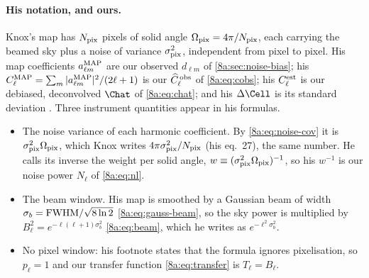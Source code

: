 \paragraph{His notation, and ours.}
Knox's map has $N_{\rm pix}$ pixels of solid angle $\Omega_{\rm pix}=4\pi/N_{\rm pix}$, each
carrying the beamed sky plus a noise of variance $\sigma_{\rm pix}^2$, independent from pixel to
pixel. His map coefficients $a^{\rm MAP}_{\ell m}$ are our observed $d_{\ell m}$ of
\cref{8a:sec:noise-bias}; his $C^{\rm MAP}_\ell=\sum_m|a^{\rm MAP}_{\ell m}|^2/(2\ell+1)$ is our
$\widehat C^{\,\rm obs}_\ell$ of \eqref{8a:eq:cobs}; his $C^{\rm est}_\ell$ is our debiased,
deconvolved $\Chat$ of \eqref{8a:eq:chat}; and his $\Delta\Cell$ is its standard deviation
. Three instrument quantities appear in his formulas.
\begin{itemize}
  \item The noise variance of each harmonic coefficient. By \eqref{8a:eq:noise-cov} it is
        $\sigma_{\rm pix}^2\Omega_{\rm pix}$, which Knox writes $4\pi\sigma_{\rm pix}^2/N_{\rm pix}$
        (his eq.~27), the same number. He calls its inverse the weight per solid angle,
        $w\equiv(\sigma_{\rm pix}^2\Omega_{\rm pix})^{-1}$, so his $w^{-1}$ is our noise power
        $N_\ell$ of \eqref{8a:eq:nl}.
  \item The beam window. His map is smoothed by a Gaussian beam of width
        $\sigma_b={\rm FWHM}/\sqrt{8\ln2}$ \eqref{8a:eq:gauss-beam}, so the sky power is multiplied by
        $B_\ell^2=e^{-\ell(\ell+1)\sigma_b^2}$ \eqref{8a:eq:beam}, which he writes as
        $e^{-\ell^2\sigma_b^2}$.
  \item No pixel window: his footnote states that the formula ignores pixelisation, so
        $p_\ell=1$ and our transfer function \eqref{8a:eq:transfer} is $T_\ell=B_\ell$.
\end{itemize}

